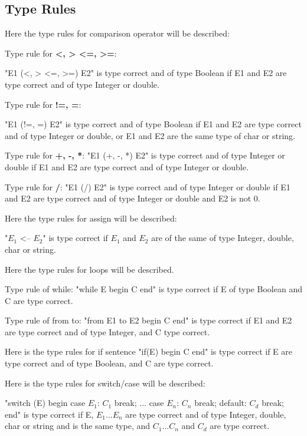 \subsection{Type Rules}
Here the type rules for comparison operator will be described:

Type rule for \textbf{<, > <=, >=}:

"E1 (<, > <=, >=) E2" is type correct and of type Boolean if E1 and E2 are type correct and of type Integer or double.

Type rule for \textbf{!=, =}:

"E1 (!=, =) E2" is type correct and of type Boolean if E1 and E2 are type correct and of type Integer or double, or E1 and E2 are the same type of char or string.

Type rule for \textbf{+, -, *}:
"E1 (+, -, *) E2" is type correct and of type Integer or double if E1 and E2 are type correct and of type Integer or double.

Type rule for \textbf{/}:
"E1 (/) E2" is type correct and of type Integer or double if E1 and E2 are type correct and of type Integer or double and E2 is not 0.

Here the type rules for assign will be described:

"$E_1$ <-- $E_2$" is type correct if $E_1$ and $E_2$ are of the same of type Integer, double, char or string.

Here the type rules for loops will be described.

Type rule of while: 
"while E begin C end" is type correct if E of type Boolean and C are type correct.

Type rule of from to: 
"from E1 to E2 begin C end" is type correct if E1 and E2 are type correct and of type Integer, and C type correct.

Here is the type rules for if sentence
"if(E) begin C end" is type correct if E are type correct and of type Boolean, and C are type correct.

Here is the type rules for switch/case will be described:

"switch (E) begin case $E_1$: $C_1$ break; ... case $E_n$: $C_n$ break; default: $C_d$ break; end" is type correct if E, $E_1$...$E_n$ are type correct and of type Integer, double, char or string and is the same type, and $C_1$...$C_n$ and $C_d$ are type correct.
